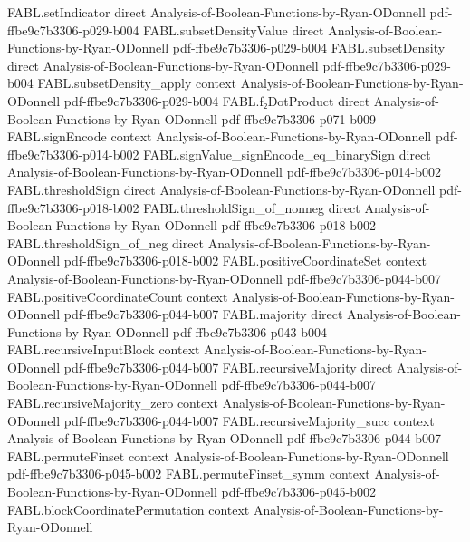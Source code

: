 \begin{theorem}
\proofstep
  {FABL.setIndicator}
  {direct}
  {Analysis-of-Boolean-Functions-by-Ryan-ODonnell}
  {pdf-ffbe9c7b3306-p029-b004}
\proofstep
  {FABL.subsetDensityValue}
  {direct}
  {Analysis-of-Boolean-Functions-by-Ryan-ODonnell}
  {pdf-ffbe9c7b3306-p029-b004}
\proofstep
  {FABL.subsetDensity}
  {direct}
  {Analysis-of-Boolean-Functions-by-Ryan-ODonnell}
  {pdf-ffbe9c7b3306-p029-b004}
\proofstep
  {FABL.subsetDensity_apply}
  {context}
  {Analysis-of-Boolean-Functions-by-Ryan-ODonnell}
  {pdf-ffbe9c7b3306-p029-b004}
\proofstep
  {FABL.f₂DotProduct}
  {direct}
  {Analysis-of-Boolean-Functions-by-Ryan-ODonnell}
  {pdf-ffbe9c7b3306-p071-b009}
\proofstep
  {FABL.signEncode}
  {context}
  {Analysis-of-Boolean-Functions-by-Ryan-ODonnell}
  {pdf-ffbe9c7b3306-p014-b002}
\proofstep
  {FABL.signValue_signEncode_eq_binarySign}
  {direct}
  {Analysis-of-Boolean-Functions-by-Ryan-ODonnell}
  {pdf-ffbe9c7b3306-p014-b002}
\proofstep
  {FABL.thresholdSign}
  {direct}
  {Analysis-of-Boolean-Functions-by-Ryan-ODonnell}
  {pdf-ffbe9c7b3306-p018-b002}
\proofstep
  {FABL.thresholdSign_of_nonneg}
  {direct}
  {Analysis-of-Boolean-Functions-by-Ryan-ODonnell}
  {pdf-ffbe9c7b3306-p018-b002}
\proofstep
  {FABL.thresholdSign_of_neg}
  {direct}
  {Analysis-of-Boolean-Functions-by-Ryan-ODonnell}
  {pdf-ffbe9c7b3306-p018-b002}
\proofstep
  {FABL.positiveCoordinateSet}
  {context}
  {Analysis-of-Boolean-Functions-by-Ryan-ODonnell}
  {pdf-ffbe9c7b3306-p044-b007}
\proofstep
  {FABL.positiveCoordinateCount}
  {context}
  {Analysis-of-Boolean-Functions-by-Ryan-ODonnell}
  {pdf-ffbe9c7b3306-p044-b007}
\proofstep
  {FABL.majority}
  {direct}
  {Analysis-of-Boolean-Functions-by-Ryan-ODonnell}
  {pdf-ffbe9c7b3306-p043-b004}
\proofstep
  {FABL.recursiveInputBlock}
  {context}
  {Analysis-of-Boolean-Functions-by-Ryan-ODonnell}
  {pdf-ffbe9c7b3306-p044-b007}
\proofstep
  {FABL.recursiveMajority}
  {direct}
  {Analysis-of-Boolean-Functions-by-Ryan-ODonnell}
  {pdf-ffbe9c7b3306-p044-b007}
\proofstep
  {FABL.recursiveMajority_zero}
  {context}
  {Analysis-of-Boolean-Functions-by-Ryan-ODonnell}
  {pdf-ffbe9c7b3306-p044-b007}
\proofstep
  {FABL.recursiveMajority_succ}
  {context}
  {Analysis-of-Boolean-Functions-by-Ryan-ODonnell}
  {pdf-ffbe9c7b3306-p044-b007}
\proofstep
  {FABL.permuteFinset}
  {context}
  {Analysis-of-Boolean-Functions-by-Ryan-ODonnell}
  {pdf-ffbe9c7b3306-p045-b002}
\proofstep
  {FABL.permuteFinset_symm}
  {context}
  {Analysis-of-Boolean-Functions-by-Ryan-ODonnell}
  {pdf-ffbe9c7b3306-p045-b002}
\proofstep
  {FABL.blockCoordinatePermutation}
  {context}
  {Analysis-of-Boolean-Functions-by-Ryan-ODonnell}

\end{theorem}
